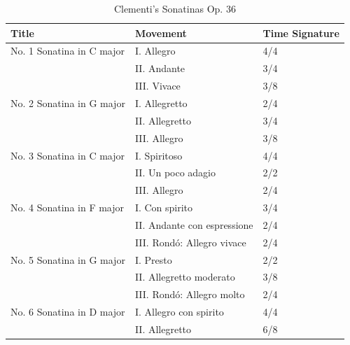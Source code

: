 \begin{table}
   \centering
   \caption{Clementi's Sonatinas Op. 36 }
   \label{tab:cleminfo}
   \begin{tabular}{lll}
      \hline
      \textbf{Title} & \textbf{Movement} & \textbf{Time Signature}\\
      \hline
      No. 1 Sonatina in C major&    I. Allegro &4/4\\
      &    II. Andante &3/4\\
      &    III. Vivace &3/8\\
      No. 2 Sonatina in G major&    I. Allegretto &2/4\\
      &    II. Allegretto &3/4\\
      &    III. Allegro &3/8\\
      No. 3 Sonatina in C major&    I. Spiritoso &4/4\\
      &    II. Un poco adagio &2/2\\
      &    III. Allegro &2/4\\
      No. 4 Sonatina in F major&    I. Con spirito &3/4\\
      &    II. Andante con espressione &2/4\\
      &    III. Rondó: Allegro vivace &2/4\\
      No. 5 Sonatina in G major&    I. Presto &2/2\\
      &    II. Allegretto moderato &3/8\\
      &    III. Rondó: Allegro molto &2/4\\
      No. 6 Sonatina in D major&    I. Allegro con spirito &4/4\\
      &   II. Allegretto   &6/8\\
      \hline
   \end{tabular}
\end{table}



